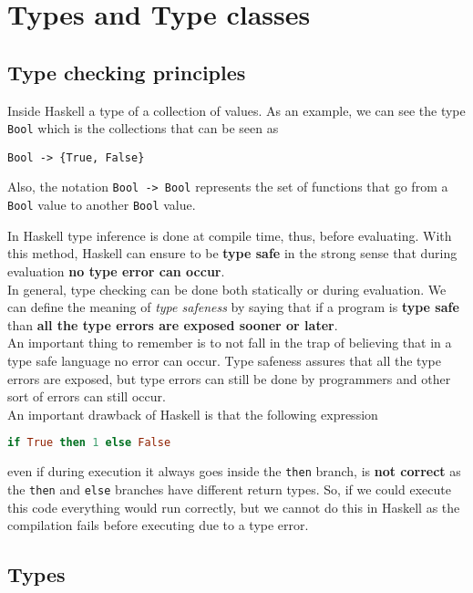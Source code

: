 \newpage
\chapter{Types and Type classes}
\section{Type checking principles}
Inside Haskell a type of a collection of values. As an example, we can see the type \texttt{Bool} which is the collections that can be seen as 

\begin{lstlisting}
Bool -> {True, False}
\end{lstlisting}

Also, the notation \texttt{Bool -> Bool} represents the set of functions that go from a \texttt{Bool} value to another \texttt{Bool} value.
\linebreak \linebreak

In Haskell type inference is done at compile time, thus, before evaluating. With this method, Haskell can ensure to be \textbf{type safe} in the strong sense that during evaluation \textbf{no type error can occur}. \\
In general, type checking can be done both statically or during evaluation. We can define the meaning of \textit{type safeness} by saying that if a program is \textbf{type safe} than \textbf{all the type errors are exposed sooner or later}. \\
An important thing to remember is to not fall in the trap of believing that in a type safe language no error can occur. Type safeness assures that all the type errors are exposed, but type errors can still be done by programmers and other sort of errors can still occur. \\
An important drawback of Haskell is that the following expression

\begin{lstlisting}[language=haskell]
if True then 1 else False
\end{lstlisting}

even if during execution it always goes inside the \texttt{then} branch, is \textbf{not correct} as the \texttt{then} and \texttt{else} branches have different return types. So, if we could execute this code everything would run correctly, but we cannot do this in Haskell as the compilation fails before executing due to a type error.

\section{Types}

